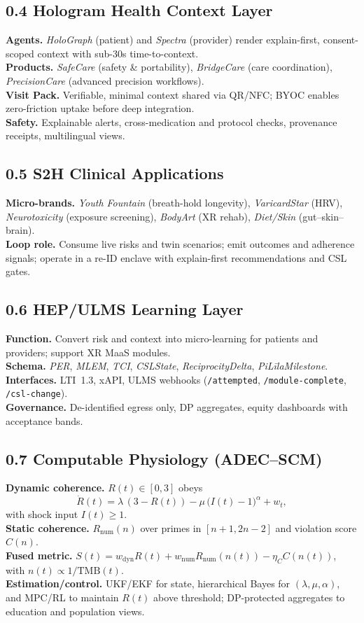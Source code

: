 \documentclass[11pt]{article}
\theoremstyle{plain}
\begin{document}
\subsection*{0.4 Hologram Health Context Layer}
\textbf{Agents.} \emph{HoloGraph} (patient) and \emph{Spectra} (provider) render explain-first, consent-scoped context with sub-30s time-to-context.\\
\textbf{Products.} \emph{SafeCare} (safety \& portability), \emph{BridgeCare} (care coordination), \emph{PrecisionCare} (advanced precision workflows).\\
\textbf{Visit Pack.} Verifiable, minimal context shared via QR/NFC; BYOC enables zero-friction uptake before deep integration.\\
\textbf{Safety.} Explainable alerts, cross-medication and protocol checks, provenance receipts, multilingual views.

\subsection*{0.5 S2H Clinical Applications}
\textbf{Micro-brands.} \emph{Youth Fountain} (breath-hold longevity), \emph{VaricardStar} (HRV), \emph{Neurotoxicity} (exposure screening), \emph{BodyArt} (XR rehab), \emph{Diet/Skin} (gut–skin–brain).\\
\textbf{Loop role.} Consume live risks and twin scenarios; emit outcomes and adherence signals; operate in a re-ID enclave with explain-first recommendations and CSL gates.

\subsection*{0.6 HEP/ULMS Learning Layer}
\textbf{Function.} Convert risk and context into micro-learning for patients and providers; support XR MaaS modules.\\
\textbf{Schema.} \emph{PER}, \emph{MLEM}, \emph{TCI}, \emph{CSLState}, \emph{ReciprocityDelta}, \emph{PiLīlaMilestone}.\\
\textbf{Interfaces.} LTI~1.3, xAPI, ULMS webhooks (\texttt{/attempted}, \texttt{/module-complete}, \texttt{/csl-change}).\\
\textbf{Governance.} De-identified egress only, DP aggregates, equity dashboards with acceptance bands.

\subsection*{0.7 Computable Physiology (ADEC--SCM)}
\textbf{Dynamic coherence.} $R(t)\in[0,3]$ obeys
\[
\dot{R}(t)=\lambda\,(3-R(t))-\mu\,\big(I(t)-1\big)^{\alpha}+w_t,
\]
with shock input $I(t)\!\ge\!1$.\\
\textbf{Static coherence.} $R_{\text{num}}(n)$ over primes in $[n+1,2n-2]$ and violation score $C(n)$.\\
\textbf{Fused metric.} $S(t)=w_{\text{dyn}}R(t)+w_{\text{num}}R_{\text{num}}(n(t))-\eta_C C(n(t))$, with $n(t)\propto 1/\mathrm{TMB}(t)$.\\
\textbf{Estimation/control.} UKF/EKF for state, hierarchical Bayes for $(\lambda,\mu,\alpha)$, and MPC/RL to maintain $R(t)$ above threshold; DP-protected aggregates to education and population views.
\end{document}
